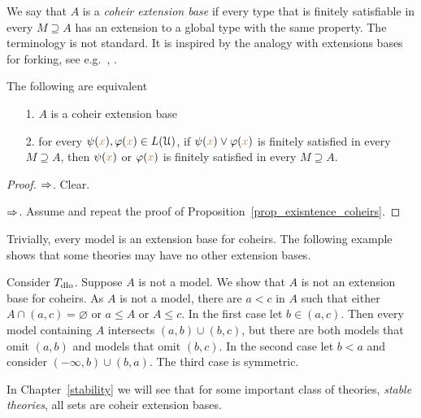 \noindent\llap{\textcolor{red}{\Large\warning}\kern1.5ex}%
We say that $A$ is a \emph{coheir extension base\/} if every type that is finitely satisfiable in every $M\supseteq A$ has an extension to a global type with the same property.
The terminology is not standard.
It is inspired by the analogy with extensions bases for forking, see e.g.~\cite{Chernikov}, \cite{Simon}.

\begin{proposition}\label{prop_exisntence_coheirs_over_sets}
  The following are equivalent
  \begin{itemize}
    \item[1.] $A$ is a coheir extension base
    \item[2.] for every $\psi({\color{brown} x}),\varphi({\color{brown} x})\in L(\EuScript U)$, if $\psi({\color{brown} x})\vee\varphi({\color{brown} x})$ is finitely satisfied in every $M\supseteq A$, then $\psi({\color{brown} x})$ or $\varphi({\color{brown} x})$ is finitely satisfied in every $M\supseteq A$. 
  \end{itemize}  
\end{proposition}
  
\begin{proof} 
  $\Rightarrow$. Clear.
  
  $\Rightarrow$. Assume  and repeat the proof of Proposition~\ref{prop_exisntence_coheirs}.
\end{proof}
  
Trivially, every model is an extension base for coheirs.
The following example shows that some theories may have no other extension bases.

\begin{example}
  Consider $T_{\rm dlo}$.
  Suppose $A$ is not a model.
  We show that $A$ is not an extension base for coheirs.
  As $A$ is not a model, there are $a<c$ in $A$ such that either $A\cap(a,c)=\varnothing$ or $a\le A$ or $A\le c$.
  In the first case let $b\in(a,c)$. 
  Then every model containing $A$ intersects $(a,b)\cup (b,c)$, but there are both models that omit $(a,b)$ and models that omit $(b,c)$.
  In the second case let $b<a$ and consider $(-\infty,b)\cup (b,a)$.
  The third case is symmetric.
\end{example}

In Chapter~\ref{stability} we will see that for some important class of theories, \textit{stable theories}, all sets are coheir extension bases.


